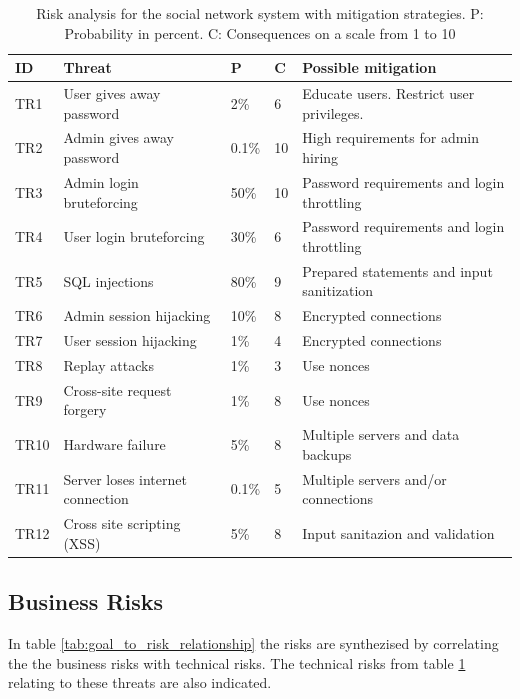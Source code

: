 \documentclass[a4paper]{article}
\begin{document}
\begin{table}[h!]
	\begin{tabular}{| l | p{4cm} | l | l | p{5cm} |}
		\hline
		\textbf{ID} & \textbf{Threat} & \textbf{P} & \textbf{C} & \textbf{Possible mitigation} \\ \hline
		TR1 & User gives away password & 2\% & 6 & Educate users. Restrict user privileges. \\ \hline
        TR2 & Admin gives away password & 0.1\%  & 10 & High requirements for admin hiring \\ \hline
        TR3 & Admin login bruteforcing & 50\% & 10 & Password requirements and login throttling \\ \hline
        TR4 & User login bruteforcing & 30\% & 6 & Password requirements and login throttling \\ \hline
        TR5 & SQL injections & 80\% & 9 & Prepared statements and input sanitization \\ \hline
        TR6 & Admin session hijacking & 10\% & 8 & Encrypted connections \\ \hline
        TR7 & User session hijacking & 1\% & 4 & Encrypted connections \\ \hline
        TR8 & Replay attacks & 1\% & 3 & Use nonces \\ \hline
       	TR9 & Cross-site request forgery & 1\% & 8 & Use nonces \\ \hline
        TR10 & Hardware failure & 5\% & 8 & Multiple servers and data backups \\ \hline
        TR11 & Server loses internet connection & 0.1\% & 5 & Multiple servers and/or connections \\ \hline
        TR12 & Cross site scripting (XSS) & 5\% & 8 & Input sanitazion and validation \\ \hline
	\end{tabular}
	\caption{Risk analysis for the social network system with mitigation strategies. P: Probability in percent. C: Consequences on a scale from 1 to 10}
	\label{tab:risk_analysis}
\end{table}

\subsection{Business Risks}
In table \ref{tab:goal_to_risk_relationship} the risks are synthezised by correlating the the business risks with technical risks. The technical risks from table \ref{tab:risk_analysis} relating to these threats are also indicated.
\end{document}
